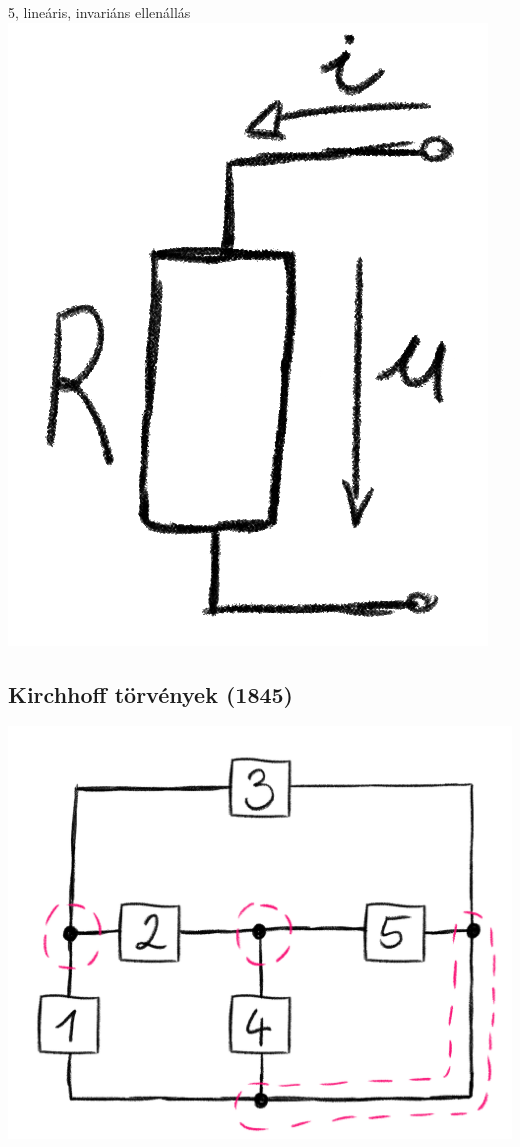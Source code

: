 \documentclass[12pt]{article}
\begin{document}
            5, lineáris, invariáns ellenállás \includegraphics{img/6.png}

        \subsection{Kirchhoff törvények (1845)}

            \includegraphics{img/7.png} 
\end{document}
